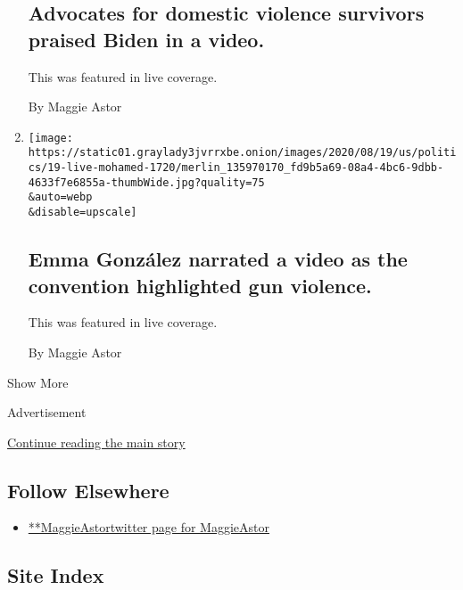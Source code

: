 \begin{enumerate}
  \hypertarget{advocates-for-domestic-violence-survivors-praised-biden-in-a-video}{%
  \subsection{Advocates for domestic violence survivors praised Biden in
  a
  video.}\label{advocates-for-domestic-violence-survivors-praised-biden-in-a-video}}

  This was featured in live coverage.

  By Maggie Astor
\item
  \href{/live/2020/08/19/us/dnc-convention-election/emma-gonzalez-narrated-a-video-as-the-convention-highlighted-gun-violence}{}

  \texttt{[image: https://static01.graylady3jvrrxbe.onion/images/2020/08/19/us/politics/19-live-mohamed-1720/merlin\_135970170\_fd9b5a69-08a4-4bc6-9dbb-4633f7e6855a-thumbWide.jpg?quality=75\\\&auto=webp\\\&disable=upscale]}

  \hypertarget{emma-gonzuxe1lez-narrated-a-video-as-the-convention-highlighted-gun-violence}{%
  \subsection{Emma González narrated a video as the convention
  highlighted gun
  violence.}\label{emma-gonzuxe1lez-narrated-a-video-as-the-convention-highlighted-gun-violence}}

  This was featured in live coverage.

  By Maggie Astor
\end{enumerate}

Show More

Advertisement

\protect\hyperlink{after-mid2}{Continue reading the main story}

\hypertarget{follow-elsewhere}{%
\subsection{Follow Elsewhere}\label{follow-elsewhere}}

\begin{itemize}
\tightlist
\item
  \href{https://twitter.com/MaggieAstor}{**MaggieAstortwitter page for
  MaggieAstor}
\end{itemize}

\hypertarget{site-index}{%
\subsection{Site Index}\label{site-index}}

